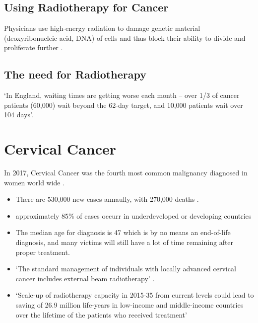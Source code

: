 \documentclass[11pt]{article}
\begin{document}
\subsection{Using Radiotherapy for Cancer}

Physicians use high-energy radiation to damage genetic material (deoxyribonucleic acid, DNA) of cells and thus block their ability to divide and proliferate further \cite{radiotherapy-advances}.

\subsection{The need for Radiotherapy}


`In England, waiting times are getting worse each month – over 1/3 of cancer patients (60,000) wait beyond the 62-day target, and 10,000 patients wait over 104 days'.

\section{Cervical Cancer}

In 2017, Cervical Cancer was the fourth most common malignancy diagnosed in women world wide \cite{cervical-cancer-epidemic}.

\begin{itemize}
    \item There are 530,000 new cases annaully, with 270,000 deaths \cite{cervical-cancer-epidemic}.
    \item approximately 85\% of cases occurr in underdeveloped or developing countries \cite{cervical-cancer-epidemic}
    \item The median age for diagnosis is 47 \cite{cervical-cancer-epidemic} which is by no means an end-of-life diagnosis, and many victims will still have a lot of time remaining after proper treatment.
    \item `The standard management of individuals with locally advanced cervical cancer includes external beam radiotherapy' \cite{cervical-cancer-epidemic}.
    \item `Scale-up of radiotherapy capacity in 2015-35 from current levels could lead to saving of 26.9 million life-years in low-income and middle-income countries over the lifetime of the patients who received treatment' \cite{expanding-global-access-to-radiotherapy}
\end{itemize}

\printbibliography
\end{document}
